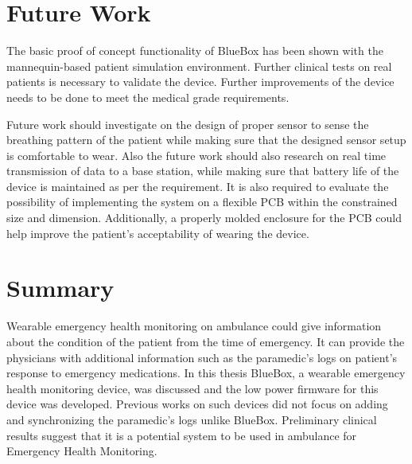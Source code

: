 \section{Future Work}
The basic proof of concept functionality of BlueBox has been shown with the mannequin-based patient simulation environment. Further clinical tests on real patients is necessary to validate the device. Further improvements of the device needs to be done to meet the medical grade requirements.

Future work should investigate on the design of proper sensor to sense the breathing pattern of the patient while making sure that the designed sensor setup is comfortable to wear. Also the future work should also research on real time transmission of data to a base station, while making sure that battery life of the device is maintained as per the requirement. It is also required to evaluate the possibility of implementing the system on a flexible PCB within the constrained size and dimension. Additionally, a properly molded enclosure for the PCB could help improve the patient's acceptability of wearing the device. 
\section{Summary}
Wearable emergency health monitoring on ambulance could give information about the condition of the patient from the time of emergency. It can provide the physicians with additional information such as the paramedic's logs on patient's response to emergency medications. In this thesis BlueBox, a wearable emergency health monitoring device, was discussed and the low power firmware for this device was developed. Previous works on such devices did not focus on adding and synchronizing the paramedic's logs unlike BlueBox. Preliminary clinical results suggest that it is a potential system to be used in ambulance for Emergency Health Monitoring.